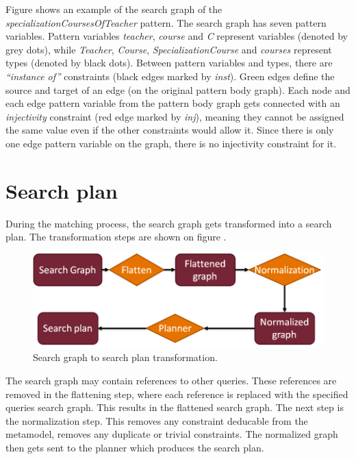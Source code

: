 Figure  shows an example of the search graph of the
\emph{specializationCoursesOfTeacher} pattern. The search graph has seven
pattern variables. Pattern variables \emph{teacher}, \emph{course} and \emph{C}
represent variables (denoted by grey dots), while \emph{Teacher},
\emph{Course}, \emph{SpecializationCourse} and \emph{courses} represent types
(denoted by black dots). Between pattern variables and types, there are
\emph{``instance of''} constraints (black edges marked by \emph{inst}). Green
edges define the source and target of an edge (on the original pattern body
graph). Each node and each edge pattern variable from the pattern body graph
gets connected with an \emph{injectivity} constraint (red edge marked by \emph{inj}), meaning they
cannot be assigned the same value even if the other constraints would allow it.
Since there is only one edge pattern variable on the graph, there is no
injectivity constraint for it.

\section{Search plan}\label{sec:SearchPlan}

During the matching process, the search graph gets transformed into a search
plan. The transformation steps are shown on figure .

\begin{figure}[!ht]
\centering
\includegraphics[width=130mm,
keepaspectratio]{figures/search_graph_plan_trans.png}
\caption{Search graph to search plan transformation.}
\label{fig:graph_to_plan}
\end{figure}

The search graph may contain references to other queries. These references are
removed in the flattening step, where each reference is replaced with the
specified queries search graph. This results in the flattened search graph. The
next step is the normalization step. This removes any constraint deducable from
the metamodel, removes any duplicate or trivial constraints. The normalized
graph then gets sent to the planner which produces the search plan. 

